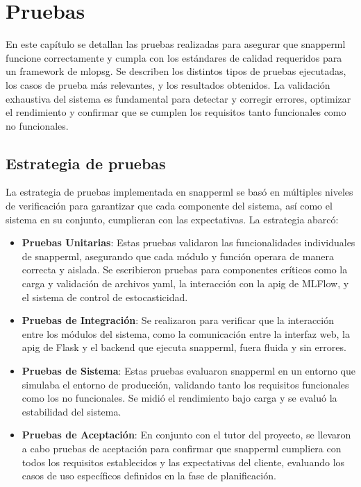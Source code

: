 \chapter{Pruebas}
En este capítulo se detallan las pruebas realizadas para asegurar que \Gls{snapperml} funcione correctamente y cumpla con los estándares de calidad requeridos para un \gls{framework} de \Gls{mlopsg}. Se describen los distintos tipos de pruebas ejecutadas, los casos de prueba más relevantes, y los resultados obtenidos. La validación exhaustiva del sistema es fundamental para detectar y corregir errores, optimizar el rendimiento y confirmar que se cumplen los requisitos tanto funcionales como no funcionales.

\section{Estrategia de pruebas} La estrategia de pruebas implementada en \Gls{snapperml} se basó en múltiples niveles de verificación para garantizar que cada componente del sistema, así como el sistema en su conjunto, cumplieran con las expectativas. La estrategia abarcó:

\begin{itemize}
    \item \textbf{Pruebas Unitarias}: Estas pruebas validaron las funcionalidades individuales de \Gls{snapperml}, asegurando que cada módulo y función operara de manera correcta y aislada. Se escribieron pruebas para componentes críticos como la carga y validación de archivos \acrshort{yaml}, la interacción con la \Gls{apig} de MLFlow, y el sistema de control de estocasticidad.
    \item \textbf{Pruebas de Integración}: Se realizaron para verificar que la interacción entre los módulos del sistema, como la comunicación entre la interfaz web, la \Gls{apig} de Flask y el \gls{backend} que ejecuta \Gls{snapperml}, fuera fluida y sin errores.
    \item \textbf{Pruebas de Sistema}: Estas pruebas evaluaron \Gls{snapperml} en un entorno que simulaba el entorno de producción, validando tanto los requisitos funcionales como los no funcionales. Se midió el rendimiento bajo carga y se evaluó la estabilidad del sistema.
    \item \textbf{Pruebas de Aceptación}: En conjunto con el tutor del proyecto, se llevaron a cabo pruebas de aceptación para confirmar que \Gls{snapperml} cumpliera con todos los requisitos establecidos y las expectativas del cliente, evaluando los casos de uso específicos definidos en la fase de planificación.
\end{itemize}

